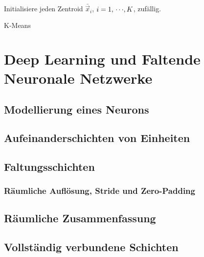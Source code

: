 		\begin{algorithm}  \DontPrintSemicolon
			Initialisiere jeden Zentroid \( \bar{\vec{x}}_i \), \( i = 1,\,\cdots\!,K \), \bspw zufällig. \;
			\caption{K-Means}
			\label{alg:kMean}
		\end{algorithm}

\chapter{Deep Learning und Faltende Neuronale Netzwerke} %
	\label{c:deepLearning}


	\section{Modellierung eines Neurons} %

	\section{Aufeinanderschichten von Einheiten} %

	\section{Faltungsschichten} %

		\subsection{Räumliche Auflösung, Stride und Zero-Padding} %

	\section{Räumliche Zusammenfassung} %

	\section{Vollständig verbundene Schichten} %

